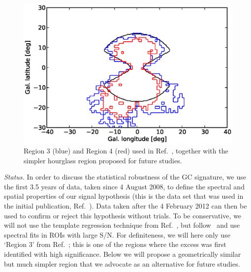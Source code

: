 \documentclass[aps,prd,superscriptaddress,showpacs,nofootinbib,fixlfloat, 12pt]{revtex4-1}
\begin{document}
\begin{figure}[h]
  \begin{center}
    \includegraphics[width=0.6\linewidth]{plots/regions.eps}
    \vspace{-0.5cm}
  \end{center}
  \caption{Region 3 (blue) and Region 4 (red) used in
    Ref.~\cite{Weniger:2012}, together with the simpler hourglass region
    proposed for future studies.}
  \label{fig:projection}
\end{figure}

\emph{Status.} In order to discuss the statistical robustness of the GC
signature, we use the first 3.5 years of data, taken since 4 August 2008, to
define the spectral and spatial properties of our signal hypothesis (this is
the data set that was used in the initial publication,
Ref.~\cite{Bringmann:2012}). Data taken after the 4 February 2012 can then be
used to confirm or reject this hypothesis without trials. To be conservative,
we will not use the template regression technique from Ref.~\cite{linepaper},
but follow~\cite{Bringmann:2012, Weniger:2012} and use spectral fits in ROIs
with large S/N.  For definiteness, we will here only use `Region 3' from
Ref.~\cite{Weniger:2012}; this is one of the regions where the excess was
first identified with high significance. Below we will
propose a geometrically similar but much simpler region that we advocate as an
alternative for future studies.
\end{document}

